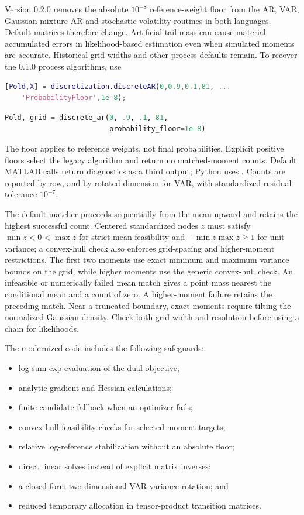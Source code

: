 Version 0.2.0 removes the absolute $10^{-8}$ reference-weight floor from the
AR, VAR, Gaussian-mixture AR and stochastic-volatility routines in both
languages. Default matrices therefore change. Artificial tail mass can cause
material accumulated errors in likelihood-based estimation even when simulated
moments are accurate. Historical grid widths and other process defaults remain.
To recover the 0.1.0 process algorithms, use
\begin{lstlisting}[language=Matlab]
[Pold,X] = discretization.discreteAR(0,0.9,0.1,81, ...
    'ProbabilityFloor',1e-8);
\end{lstlisting}
\begin{lstlisting}[language=Python]
Pold, grid = discrete_ar(0, .9, .1, 81,
                         probability_floor=1e-8)
\end{lstlisting}
The floor applies to reference weights, not final probabilities. Explicit
positive floors select the legacy algorithm and return no matched-moment
counts. Default MATLAB calls return diagnostics as a third output; Python
uses . Counts are reported by row, and by
rotated dimension for VAR, with standardized residual tolerance $10^{-7}$.

The default matcher proceeds sequentially from the mean upward and retains
the highest successful count. Centered standardized nodes $z$ must satisfy
$\min z<0<\max z$ for strict mean feasibility and
$-\min z\max z\geq 1$ for unit variance; a convex-hull check also enforces
grid-spacing and higher-moment restrictions. The first two moments use
exact minimum and maximum variance bounds on the grid, while higher moments
use the generic convex-hull check. An infeasible or numerically
failed mean match gives a point mass nearest the conditional mean and a count
of zero. A higher-moment failure retains the preceding match. Near a truncated
boundary, exact moments require tilting the normalized Gaussian density.
Check both grid width and resolution before using a chain for likelihoods.



The modernized code includes the following safeguards:
\begin{itemize}
  \item log-sum-exp evaluation of the dual objective;
  \item analytic gradient and Hessian calculations;
  \item finite-candidate fallback when an optimizer fails;
  \item convex-hull feasibility checks for selected moment targets;
  \item relative log-reference stabilization without an absolute floor;
  \item direct linear solves instead of explicit matrix inverses;
  \item a closed-form two-dimensional VAR variance rotation; and
  \item reduced temporary allocation in tensor-product transition matrices.
\end{itemize}


